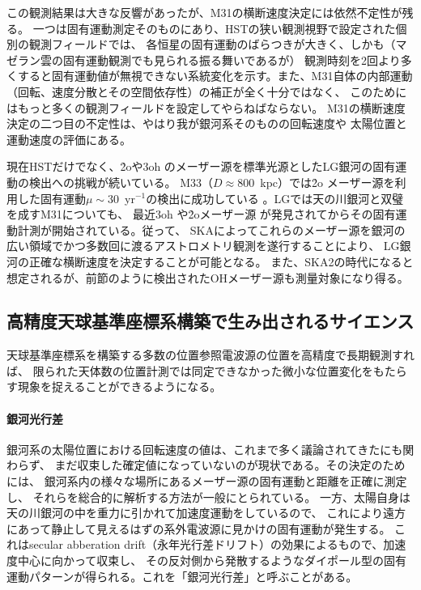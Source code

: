 この観測結果は大きな反響があったが、M31の横断速度決定には依然不定性が残る。
一つは固有運動測定そのものにあり、HSTの狭い観測視野で設定された個別の観測フィールドでは、
各恒星の固有運動のばらつきが大きく、しかも（マゼラン雲の固有運動観測でも見られる振る舞いであるが）
観測時刻を2回より多くすると固有運動値が無視できない系統変化を示す。また、M31自体の内部運動
（回転、速度分散とその空間依存性）の補正が全く十分ではなく、
このためにはもっと多くの観測フィールドを設定してやらねばならない。
M31の横断速度決定の二つ目の不定性は、やはり我が銀河系そのものの回転速度や
太陽位置と運動速度の評価にある。

現在HSTだけでなく、\h2oや\ch3oh のメーザー源を標準光源としたLG銀河の固有運動の検出への挑戦が続いている。
M33（$D\approx$800~kpc）では\h2o メーザー源を利用した固有運動$\mu\sim$30\uas ~yr$^{-1}$の検出に成功している
\citep{2005Sci...307.1440B} 。LGでは天の川銀河と双璧を成すM31についても、
最近\ch3oh \citep{2010ApJ...724L.158S}や\h2oメーザー源\citep{2011ApJ...732L...2D}
が発見されてからその固有運動計測が開始されている。従って、
SKAによってこれらのメーザー源を銀河の広い領域でかつ多数回に渡るアストロメトリ観測を遂行することにより、
LG銀河の正確な横断速度を決定することが可能となる。
また、SKA2の時代になると想定されるが、前節のように検出されたOHメーザー源も測量対象になり得る。

\setcounter{subsection}{4}\subsection{高精度天球基準座標系構築で生み出されるサイエンス}\label{c7.s3.ss5}

天球基準座標系を構築する多数の位置参照電波源の位置を高精度で長期観測すれば、
限られた天体数の位置計測では同定できなかった微小な位置変化をもたらす現象を捉えることができるようになる。

\paragraph{銀河光行差}
銀河系の太陽位置における回転速度の値は、これまで多く議論されてきたにも関わらず、
まだ収束した確定値になっていないのが現状である。その決定のためには、
銀河系内の様々な場所にあるメーザー源の固有運動と距離を正確に測定し、
それらを総合的に解析する方法が一般にとられている。
一方、太陽自身は天の川銀河の中を重力に引かれて加速度運動をしているので、
これにより遠方にあって静止して見えるはずの系外電波源に見かけの固有運動が発生する。
これはsecular abberation drift（永年光行差ドリフト）の効果によるもので、加速度中心に向かって収束し、
その反対側から発散するようなダイポール型の固有運動パターンが得られる。これを「銀河光行差」と呼ぶことがある。

